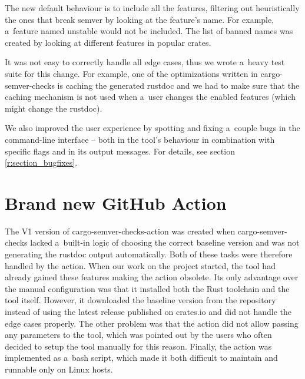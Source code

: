 \documentclass[licencjacka,en]{pracamgr}
\begin{document}
The new default behaviour is to include all the features,
filtering out heuristically the ones that break semver by looking at
the feature's name. For example, a~feature named {\ttfamily unstable} would not be
included. The list of banned names was created by looking
at different features in popular crates.

It was not easy to correctly handle all edge cases,
thus we wrote a~heavy test suite for this change.
For example, one of the optimizations written in cargo-semver-checks
is caching the generated rustdoc and we had to make sure that
the caching mechanism is not used when a~user changes the enabled features
(which might change the rustdoc).

We also improved the user experience by spotting and fixing a~couple bugs
in the command-line interface -- both in the tool's behaviour
in combination with specific flags and in its output messages.
For details, see section \ref{r:section_bugfixes}.

\section{Brand new GitHub Action}\label{r:section_github_action}

The V1 version of cargo-semver-checks-action was created when
cargo-semver-checks lacked a~built-in logic of choosing the correct baseline version and was not
generating the rustdoc output automatically. Both of these tasks were therefore handled by the action.
When our work on the project started, the tool had already gained these features making the
action obsolete. Its only advantage over the manual configuration was that it
installed both the Rust toolchain and the tool itself. However, it downloaded the baseline version from
the repository instead of using the latest release published on crates.io and did not handle the edge cases
properly. The other problem was that the action did not allow passing any parameters to the tool, which
was pointed out by the users who often decided to setup the tool manually for this reason.
Finally, the action was implemented as a~bash script, which made it both difficult to maintain
and runnable only on Linux hosts.
\end{document}
